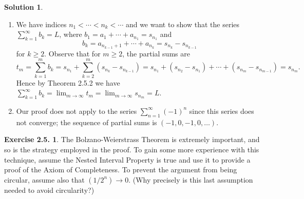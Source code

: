 \documentclass[12pt]{article}
\theoremstyle{definition}
\theoremstyle{exercise}
\newtheorem{exercise}{Exercise 2.5.}
\theoremstyle{solution}
\newtheorem*{solution}{Solution}
\begin{document}
\begin{solution}
    \begin{enumerate}
        \item We have indices \( n_1 < \cdots < n_k < \cdots \) and we want to show that the series \( \sum_{k=1}^{\infty} b_k = L \), where \( b_1 = a_1 + \cdots + a_{n_1} = s_{n_1} \) and
        \[
            b_k = a_{n_{k-1} + 1} + \cdots + a_{n_k} = s_{n_k} - s_{n_{k-1}}
        \]
        for \( k \geq 2 \). Observe that for \( m \geq 2 \), the partial sums are
        \[
            t_m = \sum_{k=1}^m b_k = s_{n_1} + \sum_{k=2}^m (s_{n_k} - s_{n_{k-1}}) = s_{n_1} + (s_{n_2} - s_{n_1}) + \cdots + (s_{n_m} - s_{n_{m-1}}) = s_{n_m}.
        \]
        Hence by Theorem 2.5.2 we have \( \sum_{k=1}^{\infty} b_k = \lim_{m \to \infty} t_m = \lim_{m \to \infty} s_{n_m} = L \).

        \item Our proof does not apply to the series \( \sum_{n=1}^{\infty} (-1)^n \) since this series does not converge; the sequence of partial sums is \( (-1, 0, -1, 0, \ldots) \).
    \end{enumerate}
\end{solution}

\begin{exercise}
\label{ex:4}
    The Bolzano-Weierstrass Theorem is extremely important, and so is the strategy employed in the proof. To gain some more experience with this technique, assume the Nested Interval Property is true and use it to provide a proof of the Axiom of Completeness. To prevent the argument from being circular, assume also that \( (1/2^n) \to 0 \). (Why precisely is this last assumption needed to avoid circularity?)
\end{exercise}
\end{document}
